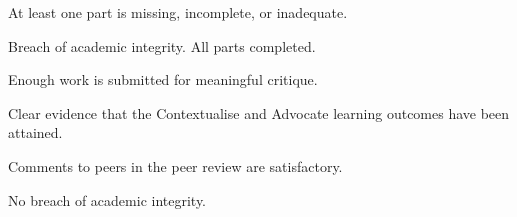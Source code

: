 \documentclass{../../fal_assignment}
\begin{document}
\begin{markingrubric}
%
        \grade \fail At least one part is missing, incomplete, or inadequate.
                   \par Breach of academic integrity.    
        \grade  All parts completed. \par Enough work is submitted for meaningful critique. \par Clear evidence that the Contextualise and Advocate learning outcomes have been attained. \par Comments to peers in the peer review are satisfactory. \par No breach of academic integrity. %
        \grade  
        \grade  
        \grade  
        \grade  
%


\end{markingrubric}
\end{document}
